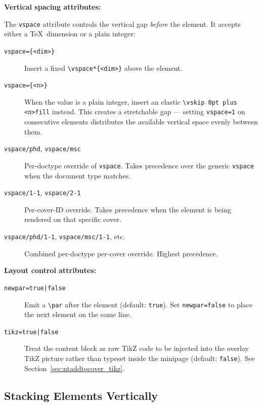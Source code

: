 \medskip
\noindent\textbf{Vertical spacing attributes:}

The \texttt{vspace} attribute controls the vertical gap \emph{before} the
element.  It accepts either a \TeX\ dimension or a plain integer:

\begin{description}
  \item[\texttt{vspace=\{<dim>\}}] Insert a fixed \verb!\vspace*{<dim>}! above
        the element.
  \item[\texttt{vspace=\{<n>\}}] When the value is a plain integer, insert an
        elastic \verb!\vskip 0pt plus <n>fill! instead.  This creates a
        stretchable gap — setting \texttt{vspace=1} on consecutive elements
        distributes the available vertical space evenly between them.
  \item[\texttt{vspace/phd}, \texttt{vspace/msc}] Per-doctype override of
        \texttt{vspace}.  Takes precedence over the generic \texttt{vspace}
        when the document type matches.
  \item[\texttt{vspace/1-1}, \texttt{vspace/2-1}] Per-cover-ID override.
        Takes precedence when the element is being rendered on that specific
        cover.
  \item[\texttt{vspace/phd/1-1}, \texttt{vspace/msc/1-1}, etc.] Combined
        per-doctype per-cover override.  Highest precedence.
\end{description}

\medskip
\noindent\textbf{Layout control attributes:}

\begin{description}
  \item[\texttt{newpar=true|false}] Emit a \verb!\par! after the element
        (default: \texttt{true}).  Set \texttt{newpar=false} to place the
        next element on the same line.
  \item[\texttt{tikz=true|false}] Treat the content block as raw TikZ code to
        be injected into the overlay TikZ picture rather than typeset inside
        the minipage (default: \texttt{false}).  See
        Section~\ref{sec:ntaddtocover_tikz}.
\end{description}


\subsection{Stacking Elements Vertically}
\label{sec:covers_vstack}

